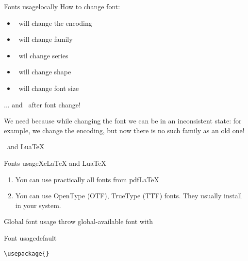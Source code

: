 \begin{frame}[t, fragile]{Fonts usage\magicPage}{locally}\relax
How to change font:
\begin{itemize}
    \item \ccol\fontencoding\ will change the encoding
    \item \ccol\fontfamily\ will change family
    \item \ccol\fontseries\ wil change series 
    \item \ccol\fontshape\ will change shape 
    \item \ccol\fontsize\ will change font size 
\end{itemize}
... and {\large \ccol\selectfont}\ after font change!

We need \ccol{\selectfont} because while changing the font we can be in an inconsistent state: for example, we change the encoding, but now there is no such family as an old one!

\end{frame}

\begin{frame}
     \centering\Huge \XeLaTeX\ and Lua\TeX
     
\end{frame}

\begin{frame}{Fonts usage}{XeLaTeX and LuaTeX}\relax
     \begin{enumerate}
         \item You can use practically all fonts from pdf\LaTeX
         \item You can use OpenType (OTF), TrueType (TTF) fonts. They usually install in your system.
          
     \end{enumerate}
\end{frame}

\begin{frame}
     \centering\huge Global font usage throw global-available font with \XeLaTeX
     
\end{frame}

\begin{frame}[fragile]{Font usage}{default}\relax


\verb|\usepackage{|\verb|}|
\end{frame}

